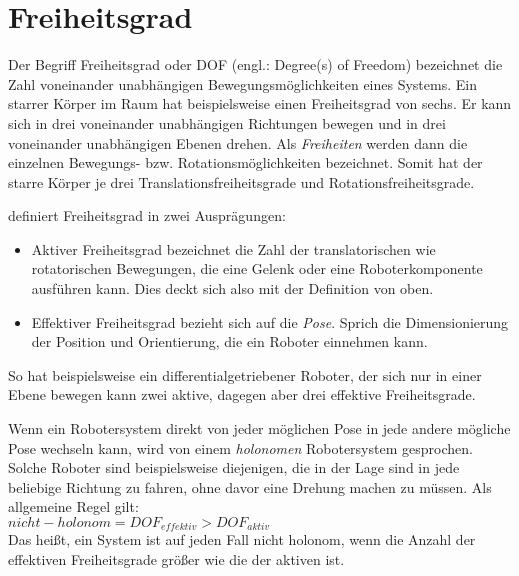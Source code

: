 \section{Freiheitsgrad}
Der Begriff Freiheitsgrad oder DOF (engl.: Degree(s) of Freedom) bezeichnet die Zahl voneinander unabhängigen Bewegungsmöglichkeiten eines Systems. Ein starrer Körper im Raum hat beispielsweise einen Freiheitsgrad von sechs. Er kann sich in drei voneinander unabhängigen Richtungen bewegen und in drei voneinander unabhängigen Ebenen drehen. Als \textit{Freiheiten} werden dann die einzelnen Bewegungs- bzw. Rotationsmöglichkeiten bezeichnet. Somit hat der starre Körper je drei Translationsfreiheitsgrade und Rotationsfreiheitsgrade. 

\cite{hertzberg2009mobile} definiert Freiheitsgrad in zwei Ausprägungen: 
\begin{itemize}
\item Aktiver Freiheitsgrad bezeichnet die Zahl der translatorischen wie rotatorischen Bewegungen, die eine Gelenk oder eine Roboterkomponente ausführen kann. Dies deckt sich also mit der Definition von oben.
\item Effektiver Freiheitsgrad bezieht sich auf die \textit{Pose}. Sprich die Dimensionierung der Position und Orientierung, die ein Roboter einnehmen kann.
\end{itemize}
So hat beispielsweise ein differentialgetriebener Roboter, der sich nur in einer Ebene bewegen kann zwei aktive, dagegen aber drei effektive Freiheitsgrade.

Wenn ein Robotersystem direkt von jeder möglichen Pose in jede andere mögliche Pose wechseln kann, wird von einem \textit{holonomen} Robotersystem gesprochen. Solche Roboter sind beispielsweise diejenigen, die in der Lage sind in jede beliebige Richtung zu fahren, ohne davor eine Drehung machen zu müssen. Als allgemeine Regel gilt: \\
$ nicht-holonom = DOF_{effektiv} > DOF_{aktiv} $ \\
Das heißt, ein System ist auf jeden Fall nicht holonom, wenn die Anzahl der effektiven Freiheitsgrade größer wie die der aktiven ist.